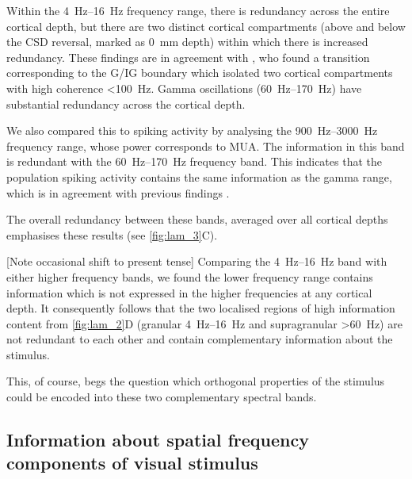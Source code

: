 Within the \SIrange{4}{16}{Hz} frequency range, there is redundancy across the entire cortical depth, but there are two distinct cortical compartments (above and below the \ac{CSD} reversal, marked as \SI{0}{mm} depth) within which there is increased redundancy.
These findings are in agreement with \citet{Maier2010}, who found a transition corresponding to the \ac{G}/\ac{IG} boundary which isolated two cortical compartments with high coherence \SI{<100}{Hz}.
Gamma oscillations (\SIrange{60}{170}{Hz}) have substantial redundancy across the cortical depth.

We also compared this to spiking activity by analysing the  \SIrange{900}{3000}{Hz} frequency range, whose power corresponds to \ac{MUA}. The information in this  band is redundant with the \SIrange{60}{170}{Hz} frequency band.
This indicates that the population spiking activity contains the same information as the gamma range, which is in agreement with previous findings \citep{Belitski2008}.

The overall redundancy between these bands, averaged over all cortical depths emphasises these results (see \autoref{fig:lam_3}C).

[Note occasional shift  to present tense]
Comparing the \SIrange{4}{16}{Hz} band with either higher frequency bands, we found the lower frequency range contains information which is not expressed in the higher frequencies at any cortical depth.
It consequently follows that the two localised regions of high information content from \autoref{fig:lam_2}D (granular \SIrange{4}{16}{Hz} and supragranular \SI{>60}{Hz}) are not redundant to each other and contain complementary information about the stimulus.

This, of course, begs the question which orthogonal properties of the stimulus could be encoded into these two complementary spectral bands.


\subsection{Information about spatial frequency components of visual stimulus}

